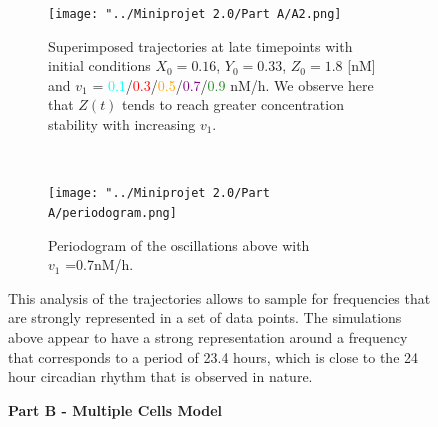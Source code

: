 \documentclass[10pt,a4paper,oneside,twocolumn]{article}
\newcommand{\red}[1]{\textcolor{red}{#1}}
\newcommand{\cyan}[1]{\textcolor{cyan}{#1}}
\newcommand{\orange}[1]{\textcolor{orange}{#1}}
\newcommand{\purple}[1]{\textcolor{purple}{#1}}
\newcommand{\fgreen}[1]{\textcolor{forestgreen}{#1}}
\numberwithin{equation}{section} %
\begin{document}
    \begin{figure}
	\centering
	\begin{subfigure}[b]{0.4\textwidth}
	    \texttt{[image: "../Miniprojet 2.0/Part A/A2.png]}
	    \caption{Superimposed trajectories at late timepoints with initial conditions $X_0 = 0.16$, $Y_0 = 0.33 $, $Z_0 = 1.8$ [nM] and $v_1$ = \cyan{0.1}/\red{0.3}/\orange{0.5}/\purple{0.7}/\fgreen{0.9} nM/h. We observe here that $Z(t)$ tends to reach greater concentration stability with increasing $v_1$.}
	\end{subfigure}
	~
	\begin{subfigure}[b]{0.4\textwidth}
	    \texttt{[image: "../Miniprojet 2.0/Part A/periodogram.png]}
	    \caption{Periodogram of the oscillations above with \\ $v_1$ =0.7nM/h.}
	\end{subfigure}
	\caption{This analysis of the trajectories allows to sample for frequencies that are strongly represented in a set of data points. The simulations above appear to have a strong representation around a frequency that corresponds to a period of 23.4 hours, which is close to the 24 hour circadian rhythm that is observed in nature.}
    \end{figure}

    \begin{figure}[!htb] 		%
	\captionsetup{labelformat=empty}
	\caption{\Huge{\textbf{Part B - Multiple Cells Model}}}
    \end{figure}
\end{document}
